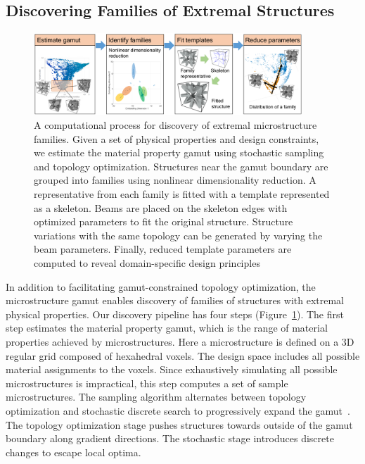 \subsection{Discovering Families of Extremal Structures}
\begin{figure}[ht]
	\centering
	\includegraphics[width=0.9\textwidth]{images/discoverPipe.pdf}
	\caption{A computational process for discovery of extremal microstructure families. Given a set of physical properties and design constraints, we estimate the material property gamut using stochastic sampling and topology optimization. Structures near the gamut boundary are grouped into families using nonlinear dimensionality reduction. A representative from each family is fitted with a template represented as a skeleton. Beams are placed on the skeleton edges with optimized parameters to fit the original structure. Structure variations with the same topology can be generated by varying the beam parameters. Finally, reduced template parameters are computed to reveal domain-specific design principles}
	\label{fig:discoverFamily}
\end{figure}
In addition to facilitating gamut-constrained topology optimization, 
the microstructure gamut enables discovery of 
families of structures with extremal physical properties.
Our discovery pipeline has four steps (Figure~\ref{fig:discoverFamily}).
The first step estimates the material property gamut, which is the range of material properties achieved by microstructures. Here a microstructure is defined on a 3D regular grid composed of hexahedral voxels. The design space includes all possible material assignments to the voxels. Since exhaustively simulating all possible microstructures is impractical, this step computes a set of sample microstructures. The sampling algorithm alternates between topology optimization and stochastic discrete search to progressively expand the gamut~\cite{Zhu2017}. The topology optimization stage pushes structures towards outside of the gamut boundary along gradient directions. The stochastic stage introduces discrete changes to escape local optima.

